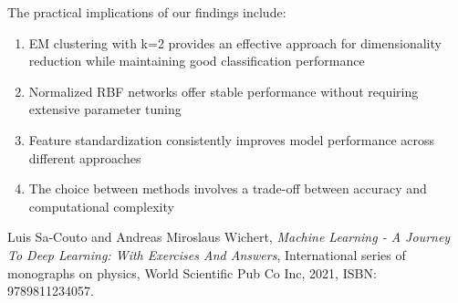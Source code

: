 \documentclass[11pt]{article}
\begin{document}
The practical implications of our findings include:
\begin{enumerate}
  \setlength{\itemsep}{0pt}
    \item EM clustering with k=2 provides an effective approach for dimensionality reduction while maintaining good classification performance
    \item Normalized RBF networks offer stable performance without requiring extensive parameter tuning
    \item Feature standardization consistently improves model performance across different approaches
    \item The choice between methods involves a trade-off between accuracy and computational complexity
\end{enumerate}

\begin{thebibliography}{99}

Luis Sa-Couto and Andreas Miroslaus Wichert, 
\textit{Machine Learning - A Journey To Deep Learning: With Exercises And Answers}, 
International series of monographs on physics, 
World Scientific Pub Co Inc, 2021, ISBN: 9789811234057.

\end{thebibliography}
\end{document}
